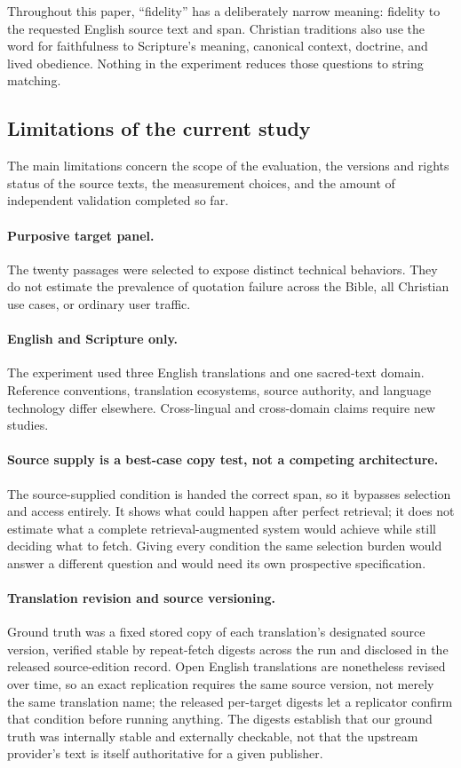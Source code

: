\documentclass[11pt]{article}
\begin{document}
Throughout this paper, ``fidelity'' has a deliberately narrow meaning:
fidelity to the requested English source text and span. Christian traditions
also use the word for faithfulness to Scripture's meaning, canonical context,
doctrine, and lived obedience. Nothing in the experiment reduces those
questions to string matching.

\subsection{Limitations of the current study}

The main limitations concern the scope of the evaluation, the versions and
rights status of the source texts, the measurement choices, and the amount of
independent validation completed so far.

\paragraph{Purposive target panel.}
The twenty passages were selected to expose distinct technical behaviors.
They do not estimate the prevalence of quotation failure across the Bible, all
Christian use cases, or ordinary user traffic.

\paragraph{English and Scripture only.}
The experiment used three English translations and one sacred-text domain.
Reference conventions, translation ecosystems, source authority, and language
technology differ elsewhere. Cross-lingual and cross-domain claims require new
studies.

\paragraph{Source supply is a best-case copy test, not a competing architecture.}
The source-supplied condition is handed the correct span, so it bypasses
selection and access entirely. It shows what could happen after perfect
retrieval; it does not estimate what a complete retrieval-augmented system
would achieve while still deciding what to fetch. Giving every condition the
same selection burden would answer a different question and would need its own
prospective specification.

\paragraph{Translation revision and source versioning.}
Ground truth was a fixed stored copy of each translation's designated source
version, verified stable by
repeat-fetch digests across the run and disclosed in the released
source-edition record. Open English translations are nonetheless revised over
time, so an exact replication requires the same source version, not merely
the same translation name; the released per-target digests let a replicator
confirm that condition before running anything. The digests establish that our
ground truth was internally stable and externally checkable, not that the
upstream provider's text is itself authoritative for a given publisher.
\end{document}
